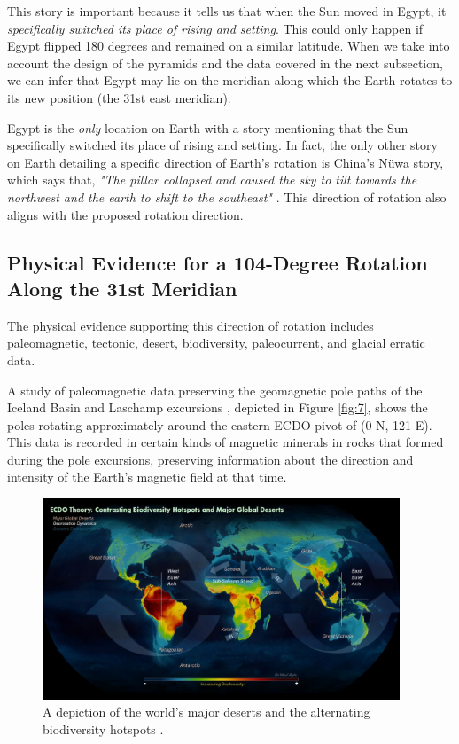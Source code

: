 \documentclass[10pt,twocolumn,letterpaper]{article}
\begin{document}
This story is important because it tells us that when the Sun moved in Egypt, it \textit{specifically switched its place of rising and setting}. This could only happen if Egypt flipped 180 degrees and remained on a similar latitude. When we take into account the design of the pyramids and the data covered in the next subsection, we can infer that Egypt may lie on the meridian along which the Earth rotates to its new position (the 31st east meridian).

Egypt is the \textit{only} location on Earth with a story mentioning that the Sun specifically switched its place of rising and setting. In fact, the only other story on Earth detailing a specific direction of Earth's rotation is China's Nüwa story, which says that, \textit{"The pillar collapsed and caused the sky to tilt towards the northwest and the earth to shift to the southeast"} \cite{8}. This direction of rotation also aligns with the proposed rotation direction.

\subsection{Physical Evidence for a 104-Degree Rotation Along the 31st Meridian}

The physical evidence supporting this direction of rotation includes paleomagnetic, tectonic, desert,  biodiversity, paleocurrent, and glacial erratic data.

A study of paleomagnetic data preserving the geomagnetic pole paths of the Iceland Basin and Laschamp excursions \cite{35}, depicted in Figure \ref{fig:7}, shows the poles rotating approximately around the eastern ECDO pivot of (0 N, 121 E). This data is recorded in certain kinds of magnetic minerals in rocks that formed during the pole excursions, preserving information about the direction and intensity of the Earth's magnetic field at that time.

\begin{figure}[t]
\begin{center}
\includegraphics[width=0.95\textwidth]{biodiversity.jpg}
\end{center}
   \caption{A depiction of the world's major deserts and the alternating biodiversity hotspots \cite{28}.}
\label{fig:9}
\end{figure}
\end{document}
